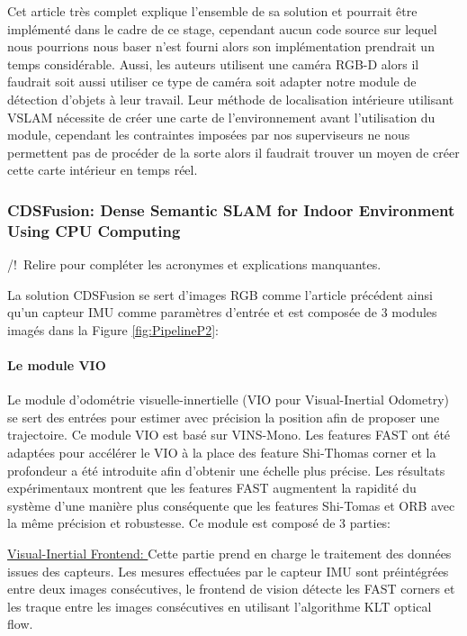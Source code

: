 \documentclass[11pt]{article}
\begin{document}
  Cet article très complet explique l'ensemble de sa solution et pourrait être implémenté dans le cadre de ce stage, cependant aucun code
  source sur lequel nous pourrions nous baser n'est fourni alors son implémentation prendrait un temps considérable. Aussi, les auteurs 
  utilisent une caméra RGB-D alors il faudrait soit aussi utiliser ce type de caméra soit adapter notre module de détection d'objets à 
  leur travail.
  Leur méthode de localisation intérieure utilisant VSLAM nécessite de créer une carte de l'environnement avant l'utilisation du module, cependant
  les contraintes imposées par nos superviseurs ne nous permettent pas de procéder de la sorte alors il faudrait trouver un moyen de créer 
  cette carte intérieur en temps réel.
  
  \pagebreak

  \subsubsection{CDSFusion: Dense Semantic SLAM for Indoor Environment Using CPU
  Computing}
  /!\ Relire pour compléter les acronymes et explications manquantes.

  La solution CDSFusion se sert d'images RGB comme l'article précédent ainsi qu'un capteur IMU comme paramètres d'entrée et est composée de 
  3 modules imagés dans la Figure \ref{fig:PipelineP2}:

  \paragraph{Le module VIO}
  Le module d'odométrie visuelle-innertielle (VIO pour Visual-Inertial Odometry) se sert des entrées pour estimer avec précision la position 
  afin de proposer une trajectoire. Ce module VIO est basé sur VINS-Mono. Les features FAST ont été adaptées pour accélérer le VIO à 
  la place des feature Shi-Thomas corner et la profondeur a été introduite afin d'obtenir une échelle plus précise. Les résultats 
  expérimentaux montrent que les features FAST augmentent la rapidité du système d'une manière plus conséquente que les features Shi-Tomas 
  et ORB avec la même précision et robustesse. Ce module est composé de 3 parties:

  \underline{Visual-Inertial Frontend: }
  Cette partie prend en charge le traitement des données issues des capteurs. Les mesures effectuées par le capteur IMU
  sont préintégrées entre deux images consécutives, le frontend de vision détecte les FAST corners et les traque entre les images consécutives
  en utilisant l'algorithme KLT optical flow.
\end{document}
